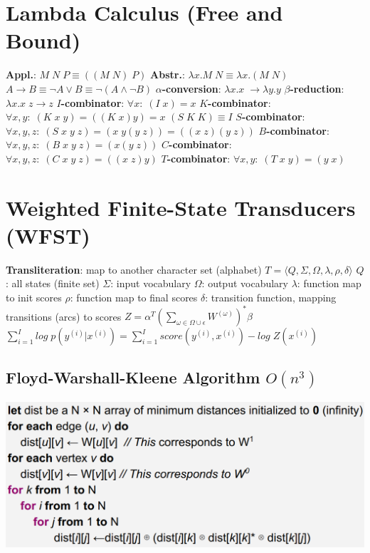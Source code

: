 \documentclass[a4paper, 11pt, landscape]{article}
\begin{document}
\begin{multicols*}{3}
\section{Lambda Calculus (Free and Bound)}
\textbf{Appl.}: $M\;N\;P \equiv ((M\;N)\;P)$\quad
\textbf{Abstr.}: $\lambda x.M\;N\equiv \lambda x.(M\;N)$\newline
$A\rightarrow B \equiv \neg A \vee  B \equiv \neg(A \wedge \neg B)$\quad
\textbf{$\alpha$-conversion}: $\lambda x.x\;\rightarrow \lambda y.y$\newline
\textbf{$\beta$-reduction}: $\lambda x.x\;z \rightarrow z$\qquad
\textbf{$I$-combinator}: $\forall x:\;(I\;x)=x$\newline
\textbf{$K$-combinator}: $\forall x,y:\;(K\;x\;y)=((K\;x)y)=x$\quad
$(S\;K\;K)\equiv I$\newline
\textbf{$S$-combinator}: $\forall x,y,z:\;(S\;x\;y\;z)=(x\;y(y\;z))=((x\;z)(y\;z))$
\textbf{$B$-combinator}: $\forall x,y,z:\;(B\;x\;y\;z)=(x(y\;z))$\newline
\textbf{$C$-combinator}: $\forall x,y,z:\;(C\;x\;y\;z)=((x\;z)y)$\newline
\textbf{$T$-combinator}: $\forall x,y:\;(T\;x\;y)=(y\;x)$

\section{Weighted Finite-State Transducers (WFST)}
\textbf{Transliteration}: map to another character set (alphabet)\newline
$T=\langle Q,\Sigma,\Omega,\lambda,\rho,\delta\rangle$\newline
$Q$: all states (finite set)\newline
$\Sigma$: input vocabulary \newline 
$\Omega$: output vocabulary\newline
$\lambda$: function map to init scores\newline
$\rho$: function map to final scores\newline
$\delta$: transition function, mapping transitions (arcs) to scores\newline
$Z=\alpha^T\left(\sum_{\omega\in\Omega\cup{\epsilon}}{W^{(\omega)}}\right)^*\beta$\newline
$\sum_{i=1}^{I}{log\;p(y^{(i)}|x^{(i)})}=\sum_{i=1}^{I}{score(y^{(i)},x^{(i)})-log\;Z(x^{(i)})}$\newline
\subsection{Floyd-Warshall-Kleene Algorithm $O(n^3)$}
\includegraphics[scale=0.42]{fwk}


\end{multicols*}
\end{document}
